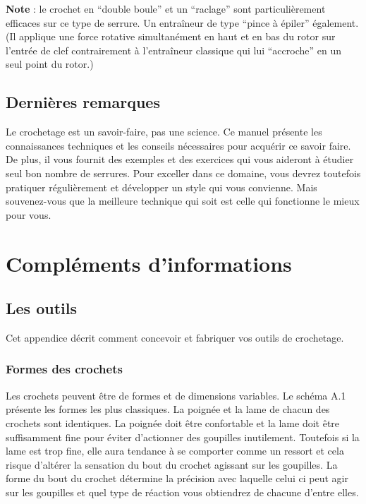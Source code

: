 \documentclass[a4paper,french,11pt,twoside]{report}
\begin{document}

\noindent \textbf{Note} : le crochet en \enquote{double boule} et un \enquote{raclage} sont particulièrement efficaces sur ce type de serrure.
Un entraîneur de type \enquote{pince à épiler} également. (Il applique une force rotative simultanément en haut et en bas du rotor sur l'entrée de clef contrairement à l'entraîneur classique qui lui \enquote{accroche} en un seul point du rotor.)

\section{Dernières remarques}

Le crochetage est un savoir-faire, pas une science. Ce manuel présente les connaissances techniques et les conseils nécessaires pour acquérir ce savoir faire. De plus, il vous fournit des exemples et des exercices qui vous aideront à étudier seul bon nombre de serrures. Pour exceller dans ce domaine, vous devrez toutefois pratiquer régulièrement et développer un style qui vous convienne. Mais souvenez-vous que la meilleure technique qui soit est celle qui fonctionne le mieux pour vous.

\chapter{\label{chap:complements}Compléments d'informations}

\section{Les outils}

Cet appendice décrit comment concevoir et fabriquer vos outils de crochetage.

\subsection{Formes des crochets}

Les crochets peuvent être de formes et de dimensions variables. Le schéma A.1 présente les formes les plus classiques. La poignée et la lame de chacun des crochets sont identiques. La poignée doit être confortable et la lame doit être suffisamment fine pour éviter d'actionner des goupilles inutilement. Toutefois si la lame est trop fine, elle aura tendance à se comporter comme un ressort et cela risque d'altérer la sensation du bout du crochet agissant sur les goupilles. La forme du bout du crochet détermine la précision avec laquelle celui ci peut agir sur les goupilles et quel type de réaction vous obtiendrez de chacune d'entre elles.
\end{document}
